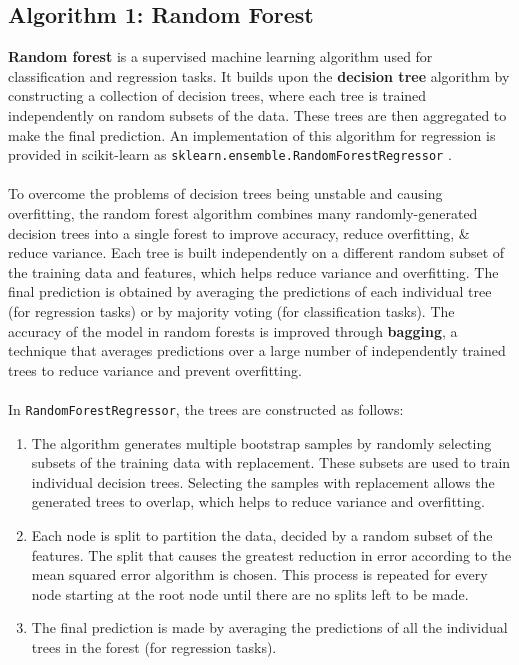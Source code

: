 \documentclass[a4paper]{article}
\begin{document}
\subsection{Algorithm 1: Random Forest}
\textbf{Random forest} is a supervised machine learning algorithm used for classification and regression tasks.
It builds upon the \textbf{decision tree} algorithm by constructing a collection of decision trees, where each tree is trained independently on random subsets of the data.
These trees are then aggregated to make the final prediction. 
An implementation of this algorithm for regression is provided in scikit-learn as \texttt{sklearn.ensemble.RandomForestRegressor} \supercite{scikit_randomforestregressor}. 
\\\\
To overcome the problems of decision trees being unstable and causing overfitting, the random forest algorithm combines many randomly-generated decision trees into a single forest to improve accuracy, reduce overfitting, \& reduce variance.
Each tree is built independently on a different random subset of the training data and features, which helps reduce variance and overfitting. 
The final prediction is obtained by averaging the predictions of each individual tree (for regression tasks) or by majority voting (for classification tasks).
The accuracy of the model in random forests is improved through \textbf{bagging}, a technique that averages predictions over a large number of independently trained trees to reduce variance and prevent overfitting.
\\\\
In \texttt{RandomForestRegressor}, the trees are constructed as follows:
\begin{enumerate}
    \item   The algorithm generates multiple bootstrap samples by randomly selecting subsets of the training data with replacement.
            These subsets are used to train individual decision trees.
            Selecting the samples with replacement allows the generated trees to overlap, which helps to reduce variance and overfitting.

    \item   Each node is split to partition the data, decided by a random subset of the features.
            The split that causes the greatest reduction in error according to the mean squared error algorithm is chosen.
            This process is repeated for every node starting at the root node until there are no splits left to be made.

    \item   The final prediction is made by averaging the predictions of all the individual trees in the forest (for regression tasks).
\end{enumerate}
\end{document}
